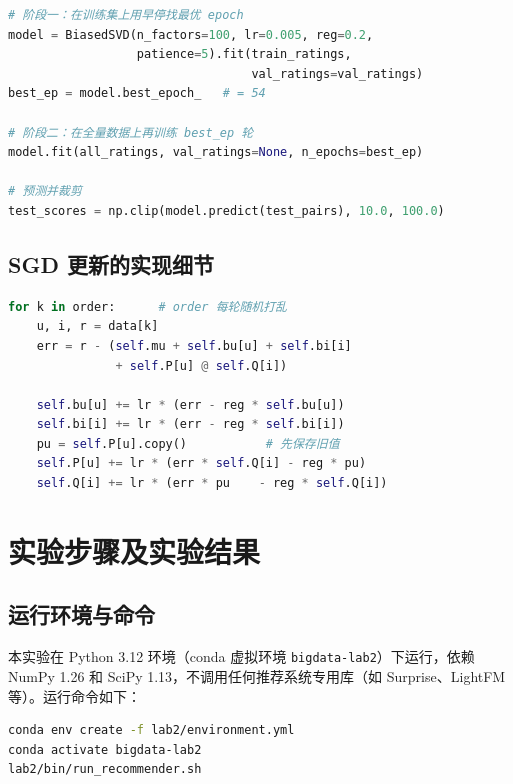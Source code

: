 \documentclass[UTF8,a4paper,10pt]{ctexart}
\newcommand{\xiaosi}{\fontsize{12pt}{20pt}\selectfont}
\begin{document}
\begin{lstlisting}[language=Python, caption={两阶段训练主流程（摘自 recommender.py）}]
# 阶段一：在训练集上用早停找最优 epoch
model = BiasedSVD(n_factors=100, lr=0.005, reg=0.2,
                  patience=5).fit(train_ratings,
                                  val_ratings=val_ratings)
best_ep = model.best_epoch_   # = 54

# 阶段二：在全量数据上再训练 best_ep 轮
model.fit(all_ratings, val_ratings=None, n_epochs=best_ep)

# 预测并裁剪
test_scores = np.clip(model.predict(test_pairs), 10.0, 100.0)
\end{lstlisting}

\subsection{SGD 更新的实现细节}

\begin{lstlisting}[language=Python, caption={单步 SGD 更新（摘自 BiasedSVD.fit）}]
for k in order:      # order 每轮随机打乱
    u, i, r = data[k]
    err = r - (self.mu + self.bu[u] + self.bi[i]
               + self.P[u] @ self.Q[i])

    self.bu[u] += lr * (err - reg * self.bu[u])
    self.bi[i] += lr * (err - reg * self.bi[i])
    pu = self.P[u].copy()           # 先保存旧值
    self.P[u] += lr * (err * self.Q[i] - reg * pu)
    self.Q[i] += lr * (err * pu    - reg * self.Q[i])
\end{lstlisting}

\section{实验步骤及实验结果}
\xiaosi

\subsection{运行环境与命令}

本实验在 Python 3.12 环境（conda 虚拟环境 \texttt{bigdata-lab2}）下运行，依赖 NumPy 1.26 和 SciPy 1.13，不调用任何推荐系统专用库（如 Surprise、LightFM 等）。运行命令如下：

\begin{lstlisting}[language=bash, caption={环境创建与运行}]
conda env create -f lab2/environment.yml
conda activate bigdata-lab2
lab2/bin/run_recommender.sh
\end{lstlisting}
\end{document}
